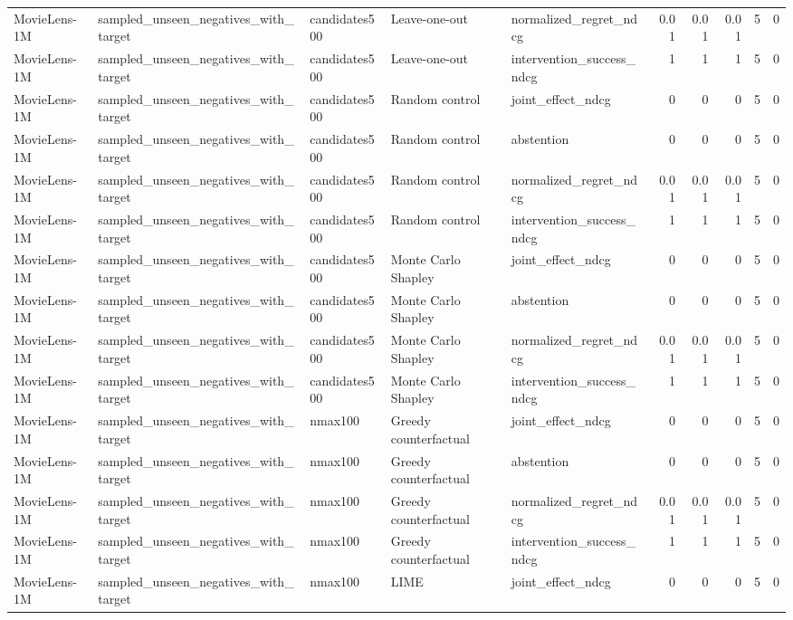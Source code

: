 \begin{table}[t]
{\begin{tabular}{lllllrrrrr}
MovieLens-1M & sampled\_unseen\_negatives\_with\_target & candidates500 & Leave-one-out & normalized\_regret\_ndcg & 0.01 & 0.01 & 0.01 & 5 & 0 \\
MovieLens-1M & sampled\_unseen\_negatives\_with\_target & candidates500 & Leave-one-out & intervention\_success\_ndcg & 1 & 1 & 1 & 5 & 0 \\
MovieLens-1M & sampled\_unseen\_negatives\_with\_target & candidates500 & Random control & joint\_effect\_ndcg & 0 & 0 & 0 & 5 & 0 \\
MovieLens-1M & sampled\_unseen\_negatives\_with\_target & candidates500 & Random control & abstention & 0 & 0 & 0 & 5 & 0 \\
MovieLens-1M & sampled\_unseen\_negatives\_with\_target & candidates500 & Random control & normalized\_regret\_ndcg & 0.01 & 0.01 & 0.01 & 5 & 0 \\
MovieLens-1M & sampled\_unseen\_negatives\_with\_target & candidates500 & Random control & intervention\_success\_ndcg & 1 & 1 & 1 & 5 & 0 \\
MovieLens-1M & sampled\_unseen\_negatives\_with\_target & candidates500 & Monte Carlo Shapley & joint\_effect\_ndcg & 0 & 0 & 0 & 5 & 0 \\
MovieLens-1M & sampled\_unseen\_negatives\_with\_target & candidates500 & Monte Carlo Shapley & abstention & 0 & 0 & 0 & 5 & 0 \\
MovieLens-1M & sampled\_unseen\_negatives\_with\_target & candidates500 & Monte Carlo Shapley & normalized\_regret\_ndcg & 0.01 & 0.01 & 0.01 & 5 & 0 \\
MovieLens-1M & sampled\_unseen\_negatives\_with\_target & candidates500 & Monte Carlo Shapley & intervention\_success\_ndcg & 1 & 1 & 1 & 5 & 0 \\
MovieLens-1M & sampled\_unseen\_negatives\_with\_target & nmax100 & Greedy counterfactual & joint\_effect\_ndcg & 0 & 0 & 0 & 5 & 0 \\
MovieLens-1M & sampled\_unseen\_negatives\_with\_target & nmax100 & Greedy counterfactual & abstention & 0 & 0 & 0 & 5 & 0 \\
MovieLens-1M & sampled\_unseen\_negatives\_with\_target & nmax100 & Greedy counterfactual & normalized\_regret\_ndcg & 0.01 & 0.01 & 0.01 & 5 & 0 \\
MovieLens-1M & sampled\_unseen\_negatives\_with\_target & nmax100 & Greedy counterfactual & intervention\_success\_ndcg & 1 & 1 & 1 & 5 & 0 \\
MovieLens-1M & sampled\_unseen\_negatives\_with\_target & nmax100 & LIME & joint\_effect\_ndcg & 0 & 0 & 0 & 5 & 0 \\

\end{tabular}}
\end{table}
